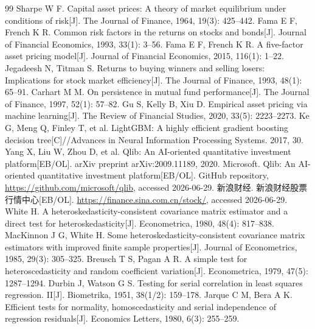 \documentclass[UTF8,a4paper,12pt]{ctexart}
\begin{document}
\begin{thebibliography}{99}
 Sharpe W F. Capital asset prices: A theory of market equilibrium under conditions of risk[J]. The Journal of Finance, 1964, 19(3): 425--442.
 Fama E F, French K R. Common risk factors in the returns on stocks and bonds[J]. Journal of Financial Economics, 1993, 33(1): 3--56.
 Fama E F, French K R. A five-factor asset pricing model[J]. Journal of Financial Economics, 2015, 116(1): 1--22.
 Jegadeesh N, Titman S. Returns to buying winners and selling losers: Implications for stock market efficiency[J]. The Journal of Finance, 1993, 48(1): 65--91.
 Carhart M M. On persistence in mutual fund performance[J]. The Journal of Finance, 1997, 52(1): 57--82.
 Gu S, Kelly B, Xiu D. Empirical asset pricing via machine learning[J]. The Review of Financial Studies, 2020, 33(5): 2223--2273.
 Ke G, Meng Q, Finley T, et al. LightGBM: A highly efficient gradient boosting decision tree[C]//Advances in Neural Information Processing Systems. 2017, 30.
 Yang X, Liu W, Zhou D, et al. Qlib: An AI-oriented quantitative investment platform[EB/OL]. arXiv preprint arXiv:2009.11189, 2020.
 Microsoft. Qlib: An AI-oriented quantitative investment platform[EB/OL]. GitHub repository, \url{https://github.com/microsoft/qlib}, accessed 2026-06-29.
 新浪财经. 新浪财经股票行情中心[EB/OL]. \url{https://finance.sina.com.cn/stock/}, accessed 2026-06-29.
 White H. A heteroskedasticity-consistent covariance matrix estimator and a direct test for heteroskedasticity[J]. Econometrica, 1980, 48(4): 817--838.
 MacKinnon J G, White H. Some heteroskedasticity-consistent covariance matrix estimators with improved finite sample properties[J]. Journal of Econometrics, 1985, 29(3): 305--325.
 Breusch T S, Pagan A R. A simple test for heteroscedasticity and random coefficient variation[J]. Econometrica, 1979, 47(5): 1287--1294.
 Durbin J, Watson G S. Testing for serial correlation in least squares regression. II[J]. Biometrika, 1951, 38(1/2): 159--178.
 Jarque C M, Bera A K. Efficient tests for normality, homoscedasticity and serial independence of regression residuals[J]. Economics Letters, 1980, 6(3): 255--259.
\end{thebibliography}
\end{document}
